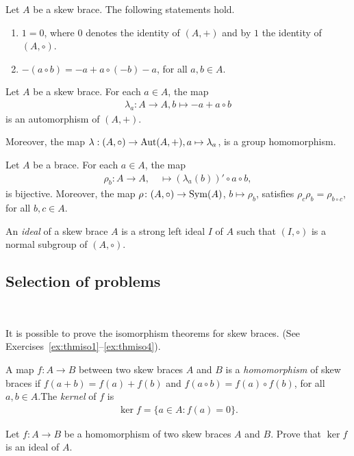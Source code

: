 \documentclass[12pt]{amsproc}
\begin{document}
\begin{fact}
    Let $A$ be a skew brace. The following statements hold.
        \begin{enumerate}
            \item $1=0$, where $0$ denotes the identity of $(A,+)$ and by $1$ the identity of $(A,\circ)$.
            \item $-(a\circ b) = - a + a\circ(- b) - a$, for all $a,b \in A$.
        \end{enumerate}
\end{fact}

    \begin{fact}\label{prop:lambda}
        Let $A$ be a skew brace. For each $a\in A$, the map 
        \begin{align*}
            \lambda_a:A\to A, b\mapsto -a + a \circ b
        \end{align*}
    is an automorphism of $(A,+)$. 
    
    Moreover, the map $\lambda: (A,\circ) \to \operatorname{Aut}(A,+), a \mapsto \lambda_a$, is a group homomorphism.
    \end{fact}



    \begin{fact}\label{prop:rho}
        Let $A$ be a brace. For each $a\in A$, the map
        \begin{align*}
            \rho_b\colon A\to A,\quad
            \mapsto (\lambda_a(b))'\circ a\circ b,
        \end{align*}
        is bijective. Moreover, the map 
        $\rho\colon (A,\circ)\to\operatorname{Sym}(A)$, $b\mapsto\rho_b$, satisfies $\rho_c\rho_b=\rho_{b\circ c}$, for all $b,c\in A$. 
    \end{fact}

    \begin{definition}
        An \emph{ideal} of a skew brace $A$ is a strong left ideal $I$ of $A$ such that    $(I,\circ)$ is a normal subgroup of $(A,\circ)$.
    \end{definition}

\subsection{Selection of problems}\mbox{ }
    
It is possible to prove the isomorphism theorems for skew braces. (See Exercises~\ref{ex:thmiso1}--\ref{ex:thmiso4}).

\begin{xca}
     A map $f:A\to B$ between two skew braces $A$ and $B$ is a \emph{homomorphism} of skew braces if $f(a + b)= f(a) +f(b)$ and $f(a\circ b)= f(a)\circ f(b)$, for all $a,b\in A$.The \emph{kernel} of $f$ is
    \begin{align*}
        \ker f = \{a\in A\colon f(a)=0\}.
    \end{align*}
    
    Let $f:A\to B$ be a homomorphism of two skew braces $A$ and $B$. 
    Prove that $\ker f$ is an ideal of $A$.
\end{xca}
\end{document}
